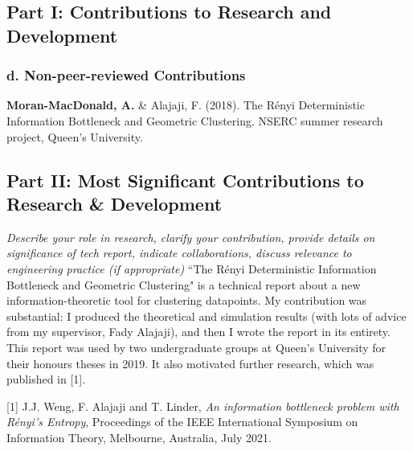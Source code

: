 \documentclass[a4paper,12pt]{article}
\begin{document}
\subsection*{Part I: Contributions to Research and Development}
\subsubsection*{d. Non-peer-reviewed Contributions}
\textbf{Moran-MacDonald, A.} \& Alajaji, F. (2018). The R\'{e}nyi Deterministic
Information Bottleneck and Geometric Clustering. NSERC summer research project,
Queen's University.

\subsection*{Part II: Most Significant Contributions to Research \& Development}
\textit{Describe your role in research, clarify your contribution, provide
    details on significance of tech report, indicate collaborations, discuss
relevance to engineering practice (if appropriate)}
``The R\'{e}nyi Deterministic Information Bottleneck and Geometric
Clustering" is a technical report about a new information-theoretic tool for
clustering datapoints.
My contribution was substantial: I produced the theoretical and simulation
results (with lots of advice from my supervisor, Fady Alajaji), and then I wrote
the report in its entirety.
This report was used by two undergraduate groups at Queen's University for their
honours theses in 2019. 
It also motivated further research, which was published in [1].

[1] J.J. Weng, F. Alajaji and T. Linder, \textit{An information bottleneck
problem with R\'{e}nyi's Entropy}, Proceedings of the IEEE International
Symposium on Information Theory, Melbourne, Australia, July 2021.
\end{document}
